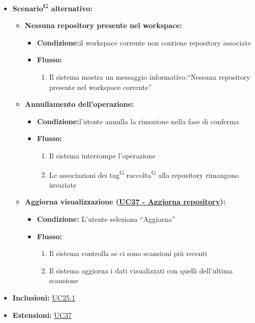 \documentclass[a4paper, 11pt]{article}
\begin{document}
\begin{itemize}
	\item \textbf{Scenario\textsuperscript{G} alternativo:}
	\begin{itemize}
		\item \textbf{Nessuna repository presente nel workspace:} 
			\begin{itemize}
				\item \textbf{Condizione:}il workspace corrente non contiene repository associate
				\item \textbf{Flusso:} 
				\begin{enumerate}
					\item Il sistema mostra un messaggio informativo:“Nessuna repository presente nel workspace corrente”
				\end{enumerate}
			\end{itemize}
        \item \textbf{Annullamento dell'operazione:} 
		\begin{itemize}
			\item \textbf{Condizione:}l'utente annulla la rimozione nella fase di conferma
			\item \textbf{Flusso:} 
			\begin{enumerate}
				\item Il sistema interrompe l'operazione
				\item Le associazioni dei tag\textsuperscript{G} raccolta\textsuperscript{G} alla repository rimangono invariate
			\end{enumerate}
		\end{itemize}
		\item \textbf{Aggiorna visualizzazione (\hyperref[UC37]{UC37 - Aggiorna repository}):}
        \begin{itemize}
            \item \textbf{Condizione:} L'utente seleziona “Aggiorna”
            \item \textbf{Flusso:}
            \begin{enumerate}
                \item Il sistema controlla se ci sono scansioni più recenti
                \item Il sistema aggiorna i dati visualizzati con quelli dell'ultima scansione
            \end{enumerate}
        \end{itemize}
	\end{itemize}
	\item \textbf{Inclusioni:} \hyperref[UC25.1]{UC25.1}
	\item \textbf{Estensioni:} \hyperref[UC37]{UC37}
\end{itemize}
\end{document}
